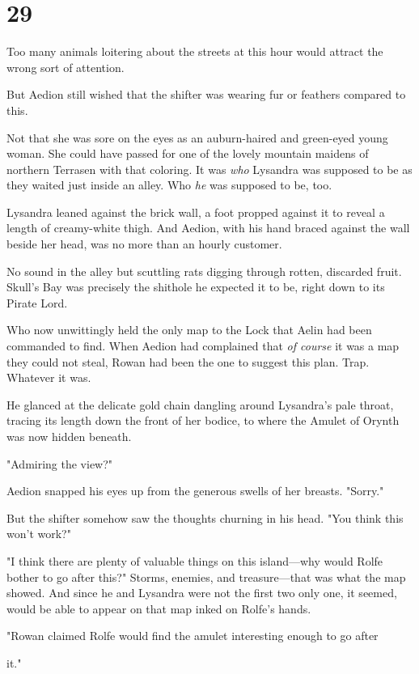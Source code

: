 
\chapter{29}

Too many animals loitering about the streets at this hour would attract the wrong sort of attention.

But Aedion still wished that the shifter was wearing fur or feathers compared to  this.

Not that she was sore on the eyes as an auburn-haired and green-eyed young woman. She could have passed for one of the lovely mountain maidens of northern Terrasen with that coloring. It was \emph{who}
Lysandra was supposed to be as they waited just inside an alley. Who
\emph{he} was supposed to be, too.

Lysandra leaned against the brick wall, a foot propped against it to reveal a length of creamy-white thigh. And Aedion, with his hand braced against the wall beside her head, was no more than an hourly customer.

No sound in the alley but scuttling rats digging through rotten, discarded fruit. Skull's Bay was precisely the shithole he expected it to be, right down to its Pirate Lord.

Who now unwittingly held the only map to the Lock that Aelin had been commanded to find. When Aedion had complained that \emph{of course} it was a map they could not steal, Rowan had been the one to suggest this
 plan. Trap. Whatever it was.

He glanced at the delicate gold chain dangling around Lysandra's pale throat, tracing its length down the front of her bodice, to where the Amulet of Orynth was now hidden beneath.

"Admiring the view?"

Aedion snapped his eyes up from the generous swells of her breasts. "Sorry."

But the shifter somehow saw the thoughts churning in his head. "You think this won't work?"

"I think there are plenty of valuable things on this island---why would Rolfe bother to go after this?" Storms, enemies, and treasure---that was what the map showed. And since he and Lysandra were not the first two  only one, it seemed, would be able to appear on that map inked on Rolfe's hands.

"Rowan claimed Rolfe would find the amulet interesting enough to go after

it."

